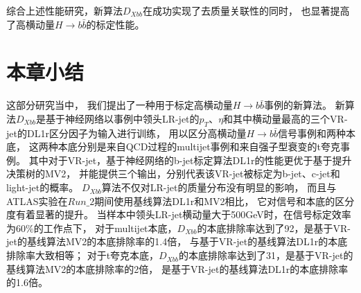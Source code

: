 综合上述性能研究，新算法$D_{Xbb}$在成功实现了去质量关联性的同时，
也显著提高了高横动量$H\rightarrow b\bar{b}$的标定性能。


\section{本章小结}
\label{sec:XbbCon}

这部分研究当中，
我们提出了一种用于标定高横动量$H\rightarrow b\bar{b}$事例的新算法。
新算法$D_{Xbb}$是基于神经网络以事例中领头LR-jet的$p_{T}$、$\eta$和其中横动量最高的三个VR-jet的DL1r区分因子为输入进行训练，
用以区分高横动量$H\rightarrow b\bar{b}$信号事例和两种本底，
这两种本底分别是来自QCD过程的multijet事例和来自强子型衰变的t夸克事例。
其中对于VR-jet，基于神经网络的b-jet标定算法DL1r的性能更优于基于提升决策树的MV2，
并能提供三个输出，分别代表该VR-jet被标定为b-jet、c-jet和light-jet的概率。
$D_{Xbb}$算法不仅对LR-jet的质量分布没有明显的影响，
而且与ATLAS实验在$Run\_2$期间使用基线算法DL1r和MV2相比，
它对信号和本底的区分度有着显著的提升。
当样本中领头LR-jet横动量大于500GeV时，在信号标定效率为$60\%$的工作点下，
对于multijet本底，$D_{Xbb}$的本底排除率达到了92，是基于VR-jet的基线算法MV2的本底排除率的1.4倍，
与基于VR-jet的基线算法DL1r的本底排除率大致相等；
对于t夸克本底，$D_{Xbb}$的本底排除率达到了31，是基于VR-jet的基线算法MV2的本底排除率的2倍，
是基于VR-jet的基线算法DL1r的本底排除率的1.6倍。

















